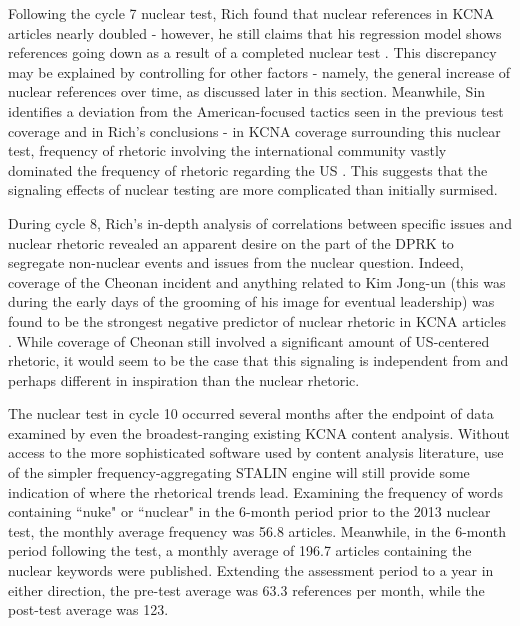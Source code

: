 Following the cycle 7 nuclear test, Rich found that nuclear references in KCNA articles nearly doubled - however, he still claims that his regression model shows references going down as a result of a completed nuclear test \cite{rich14}. This discrepancy may be explained by controlling for other factors - namely, the general increase of nuclear references over time, as discussed later in this section. Meanwhile, Sin identifies a deviation from the American-focused tactics seen in the previous test coverage and in Rich's conclusions - in KCNA coverage surrounding this nuclear test, frequency of rhetoric involving the international community vastly dominated the frequency of rhetoric regarding the US \cite{sin}. This suggests that the signaling effects of nuclear testing are more complicated than initially surmised.

During cycle 8, Rich's in-depth analysis of correlations between specific issues and nuclear rhetoric revealed an apparent desire on the part of the DPRK to segregate non-nuclear events and issues from the nuclear question. Indeed, coverage of the Cheonan incident and anything related to Kim Jong-un (this was during the early days of the grooming of his image for eventual leadership) was found to be the strongest negative predictor of nuclear rhetoric in KCNA articles \cite{rich12}. While coverage of Cheonan still involved a significant amount of US-centered rhetoric\cite{sin}, it would seem to be the case that this signaling is independent from and perhaps different in inspiration than the nuclear rhetoric.

The nuclear test in cycle 10 occurred several months after the endpoint of data examined by even the broadest-ranging existing KCNA content analysis\cite{rich14}. Without access to the more sophisticated software used by content analysis literature, use of the simpler frequency-aggregating STALIN engine will still provide some indication of where the rhetorical trends lead. Examining the frequency of words containing ``nuke" or ``nuclear" in the 6-month period prior to the 2013 nuclear test, the monthly average frequency was 56.8 articles. Meanwhile, in the 6-month period following the test, a monthly average of 196.7 articles containing the nuclear keywords were published. Extending the assessment period to a year in either direction, the pre-test average was 63.3 references per month, while the post-test average was 123.

